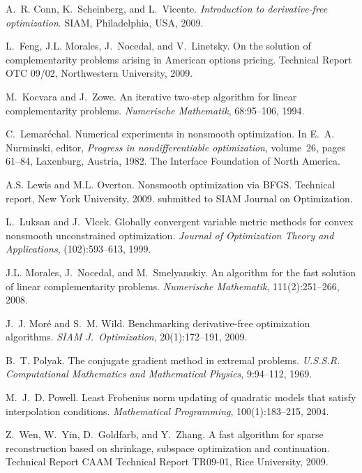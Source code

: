 \documentclass{optima}
\begin{document}
\begin{thebibliography}{10}

A.~R. Conn, K.~Scheinberg, and L.~Vicente.
\newblock \emph{Introduction to derivative-free optimization}.
\newblock SIAM, Philadelphia, USA, 2009.

L.~Feng, J.L. Morales, J.~Nocedal, and V.~Linetsky.
\newblock On the solution of complementarity problems arising in {American}
  options pricing.
\newblock Technical Report OTC 09/02, Northwestern University, 2009.

M.~Kocvara and J.~Zowe.
\newblock An iterative two-step algorithm for linear complementarity problems.
\newblock \emph{Numerische Mathematik}, 68:95--106, 1994.

C.~Lemar\'echal.
\newblock Numerical experiments in nonsmooth optimization.
\newblock In E.~A. Nurminski, editor, \emph{Progress in nondifferentiable
  optimization}, volume~26, pages 61--84, Laxenburg, Austria, 1982. The
  Interface Foundation of North America.

A.S. Lewis and M.L. Overton.
\newblock Nonsmooth optimization via {BFGS}.
\newblock Technical report, New York University, 2009.
\newblock submitted to {SIAM} Journal on Optimization.

L.~Luksan and J.~Vlcek.
\newblock Globally convergent variable metric methods for convex nonsmooth
  unconstrained optimization.
\newblock \emph{Journal of Optimization Theory and Applications},
  (102):593--613, 1999.

J.L. Morales, J.~Nocedal, and M.~Smelyanskiy.
\newblock An algorithm for the fast solution of linear complementarity
  problems.
\newblock \emph{Numerische Mathematik}, 111(2):251--266, 2008.

J.~J. Mor\'e and S.~M. Wild.
\newblock Benchmarking derivative-free optimization algorithms.
\newblock \emph{SIAM J.~Optimization}, 20(1):172--191, 2009.

B.~T. Polyak.
\newblock The conjugate gradient method in extremal problems.
\newblock \emph{U.S.S.R. Computational Mathematics and Mathematical Physics},
  9:94--112, 1969.

M.~J.~D. Powell.
\newblock Least {F}robenius norm updating of quadratic models that satisfy
  interpolation conditions.
\newblock \emph{Mathematical Programming}, 100(1):183--215, 2004.

Z.~Wen, W.~Yin, D.~Goldfarb, and Y.~Zhang.
\newblock A fast algorithm for sparse reconstruction based on shrinkage,
  subspace optimization and continuation.
\newblock Technical Report CAAM Technical Report TR09-01, Rice University,
  2009.

\end{thebibliography}
   
\end{document}
